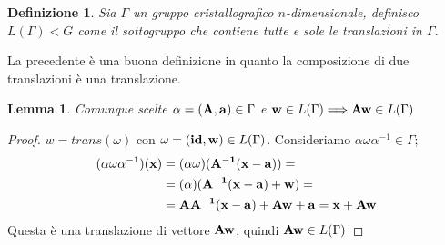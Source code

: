 \documentclass[a4paper,11pt,openright,twoside	]{book}
\newtheorem{definition}{Definizione}[section]
\newtheorem{lemma}[theorem]{Lemma}
\begin{document}
\begin{definition}
Sia $\Gamma$ un gruppo cristallografico $n$-dimensionale, definisco $L(\Gamma)<G$ come il sottogruppo che contiene tutte e sole le translazioni in $\Gamma$.
\end{definition}
La precedente è una buona definizione in quanto la composizione di due translazioni è una translazione. 
\begin{lemma}
\label{lemma:aw}
Comunque scelte $\alpha = (\vb{A, a}) \in \Gamma$ e $\vb{w} \in L(\Gamma) \Longrightarrow \vb{Aw} \in L(\Gamma)$ 
\end{lemma}
\begin{proof}
$w = trans(\omega)$ con $\omega = (\vb{id, w}	) \in L(\Gamma)$. 
Consideriamo $\alpha \omega \alpha^{-1} \in \Gamma$; 
\[ \begin{split}
( \alpha \omega \alpha^{-1} )(\vb{x}) & = ( \alpha \omega)(\vb{A^{-1}(x-a)}) = \\
& =  ( \alpha  )(\vb{A^{-1}(x-a)} + \vb{w}) = \\
& = \vb{AA^{-1}(x-a)} + \vb{Aw} + \vb{a} = \vb{x} + \vb{Aw} 
\end{split}\] 
Questa è una translazione di vettore $\vb{Aw}$, quindi $\vb{Aw} \in L(\Gamma)$
\end{proof}
\end{document}
